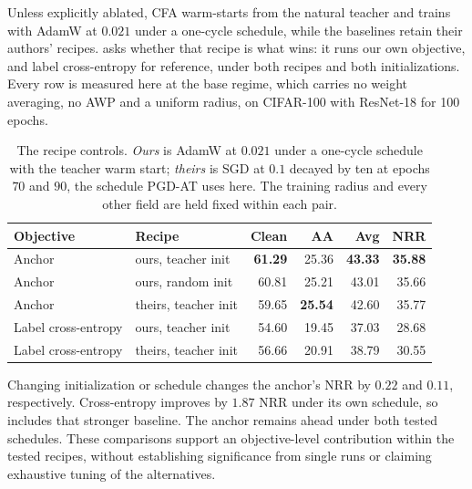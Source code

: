 \documentclass{article} %
\theoremstyle{plain}
\begin{document}
Unless explicitly ablated, CFA warm-starts from the natural teacher and trains with AdamW at $0.021$
under a one-cycle schedule, while the baselines retain their authors' recipes.  asks
whether that recipe is what wins: it runs our own objective, and label cross-entropy for reference,
under both recipes and both initializations. Every row is measured here at the base regime, which
carries no weight averaging, no AWP and a uniform radius, on CIFAR-100 with ResNet-18 for 100 epochs.

\begin{table}[!htbp]
  \centering \small \setlength{\tabcolsep}{5pt}
  \caption{The recipe controls. \emph{Ours} is AdamW at $0.021$ under a one-cycle schedule with the
  teacher warm start; \emph{theirs} is SGD at $0.1$ decayed by ten at epochs $70$ and $90$, the
  schedule PGD-AT uses here. The training radius and every other field are held fixed within each
  pair.}
  \label{tab:recipe}
  \begin{tabular}{llrrrr}
    \toprule
    Objective & Recipe & Clean & AA & Avg & NRR \\
    \midrule
    Anchor              & ours, teacher init   & \textbf{61.29} & 25.36 & \textbf{43.33} & \textbf{35.88} \\
    Anchor              & ours, random init    & 60.81 & 25.21 & 43.01 & 35.66 \\
    Anchor              & theirs, teacher init & 59.65 & \textbf{25.54} & 42.60 & 35.77 \\
    \midrule
    Label cross-entropy & ours, teacher init   & 54.60 & 19.45 & 37.03 & 28.68 \\
    Label cross-entropy & theirs, teacher init & 56.66 & 20.91 & 38.79 & 30.55 \\
    \bottomrule
  \end{tabular}
\end{table}



Changing initialization or schedule changes the anchor's NRR by $0.22$ and $0.11$, respectively.
Cross-entropy improves by $1.87$ NRR under its own schedule, so  includes that
stronger baseline. The anchor remains ahead under both tested schedules. These comparisons support
an objective-level contribution within the tested recipes, without establishing significance from
single runs or claiming exhaustive tuning of the alternatives.
\end{document}
